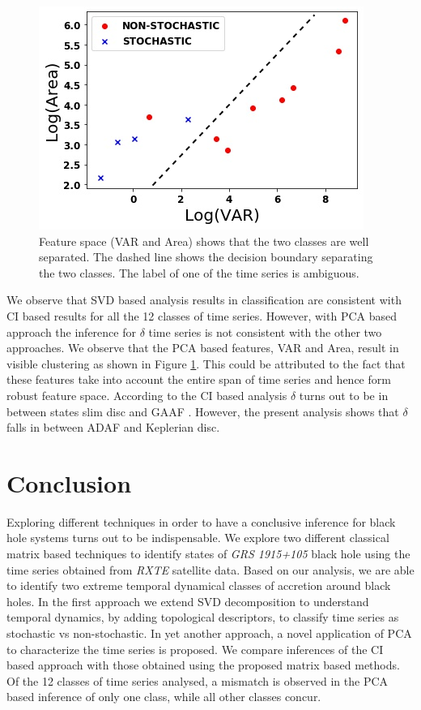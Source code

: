 \documentclass[10pt,conference]{IEEEtran}
\begin{document}
\begin{figure}
\centering
\includegraphics[width=.8\linewidth]{variance_area.drawio.png}
\caption{Feature space (VAR and Area) shows that the two classes are well separated. The dashed line shows the decision boundary separating the two classes. The label of one of the time series is ambiguous.}
\label{fig:variance_area_fs}
\end{figure}
We observe that SVD based analysis results in classification  are consistent with CI based results for all the 12 classes of time series. However, with PCA based approach the inference for  $\delta$ time series is not consistent with the other two approaches. We observe that the PCA based features, VAR and Area, result in visible clustering as shown in Figure \ref{fig:variance_area_fs}. This could be attributed to the fact that   these features take into account the entire span of time series and hence form robust feature space. According to the CI based analysis $\delta$ turns out to be in between states slim disc  and GAAF \cite{Adegoke2018}. However, the present analysis shows that $\delta$ falls in between ADAF and Keplerian disc.


\section{Conclusion}
Exploring different techniques in order to have a conclusive inference for black hole systems turns out to be indispensable. We explore two different classical matrix based techniques to identify states of \textit{GRS 1915+105} black hole using the time series obtained from \textit{RXTE} satellite data. Based on our analysis, we are able to identify two extreme temporal dynamical classes of accretion around black holes. In the first approach we extend  SVD decomposition to understand temporal dynamics,  by adding  topological descriptors, to classify time series as stochastic vs non-stochastic. In yet another approach, a novel application of  PCA  to characterize the time series is proposed. We compare inferences of the CI based approach with those obtained using the proposed matrix based methods. Of the 12 classes of time series analysed, a mismatch is observed in the PCA based inference of only one class, while all other classes concur.
\end{document}
